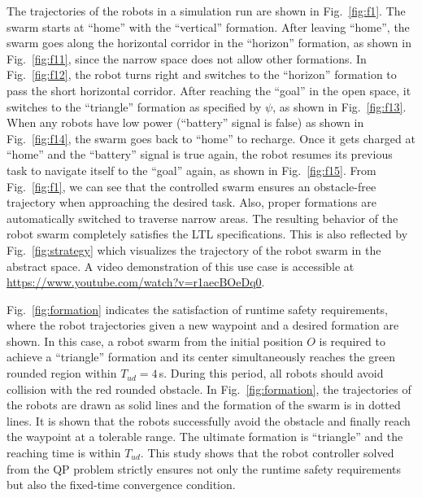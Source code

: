 \documentclass[letterpaper, 10 pt, conference]{ieeeconf}
\begin{document}
The trajectories of the robots in a simulation run are shown in Fig.~\ref{fig:f1}. The swarm starts at ``home'' with the ``vertical'' formation. After leaving ``home'', the swarm goes along the horizontal corridor in the ``horizon'' formation, as shown in Fig.~\ref{fig:f11}, since the narrow space does not allow other formations. In Fig.~\ref{fig:f12}, the robot turns right and switches to the ``horizon'' formation to pass the short horizontal corridor. After reaching the ``goal'' in the open space, it switches to the ``triangle'' formation as specified by $\psi$, as shown in Fig.~\ref{fig:f13}. When any robots have low power (``battery'' signal is false) as shown in Fig.~\ref{fig:f14}, the swarm goes back to ``home'' to recharge. Once it gets charged at ``home'' and the ``battery'' signal is true again, the robot resumes its previous task to navigate itself to the ``goal'' again, as shown in Fig.~\ref{fig:f15}. From Fig.~\ref{fig:f1}, we can see that the controlled swarm ensures an obstacle-free trajectory when approaching the desired task. Also, proper formations are automatically switched to traverse narrow areas. The resulting behavior of the robot swarm completely satisfies the LTL specifications. This is also reflected by Fig.~\ref{fig:strategy} which visualizes the trajectory of the robot swarm in the abstract space. %
A video demonstration of this use case is accessible at {\small\url{https://www.youtube.com/watch?v=r1aecBOeDq0}}.

Fig.~\ref{fig:formation} indicates the satisfaction of runtime safety requirements, where the robot trajectories given a new waypoint and a desired formation are shown. In this case, a robot swarm from the initial position $O$ is required to achieve a ``triangle'' formation and its center simultaneously reaches the green rounded region within $T_{ud} \!=\! 4\,$s. During this period, all robots should avoid collision with the red rounded obstacle. In Fig.~\ref{fig:formation}, the trajectories of the robots are drawn as solid lines and the formation of the swarm is in dotted lines. It is shown that the robots successfully avoid the obstacle and finally reach the waypoint at a tolerable range. The ultimate formation is ``triangle'' and the reaching time is within $T_{ud}$. This study shows that the robot controller solved from the QP problem strictly ensures not only the runtime safety requirements but also the fixed-time convergence condition.
\end{document}
